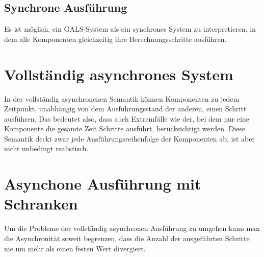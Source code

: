 \subsection{Synchrone Ausführung}
Es ist möglich, ein GALS-System als ein synchrones System zu interpretieren, in dem alle Komponenten gleichzeitig ihre Berechnungsschritte ausführen.
\section{Vollständig asynchrones System}
In der vollständig asynchronenen Semantik können Komponenten zu jedem Zeitpunkt, unabhängig von dem Ausführungsstand der anderen, einen Schritt ausführen.
Das bedeutet also, dass auch Extremfälle wie der, bei dem nur eine Komponente die gesamte Zeit Schritte ausführt, berücksichtigt werden.
Diese Semantik deckt zwar jede Ausführungsreihenfolge der Komponenten ab, ist aber nicht unbedingt realistisch.
\section{Asynchone Ausführung mit Schranken}
Um die Probleme der vollständig asynchronen Ausführung zu umgehen kann man die Asynchronität soweit begrenzen, dass die Anzahl der ausgeführten Schritte nie um mehr als einen festen Wert divergiert.

